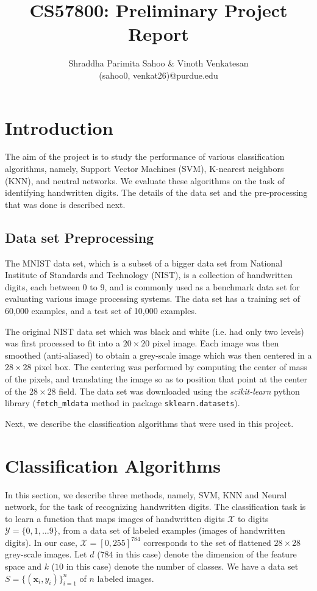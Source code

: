 \documentclass[10pt]{scrartcl}
\title{CS57800: Preliminary Project Report}
\author{Shraddha Parimita Sahoo \& Vinoth Venkatesan \\ (sahoo0, venkat26)@purdue.edu} %
\date{}
\newcommand{\vx}{\mathbf{x}}                        %
\begin{document}
\maketitle
\section*{Introduction} 
The aim of the project is to study the performance of various classification algorithms, namely, Support Vector Machines (SVM), K-nearest neighbors (KNN), and neutral networks. We evaluate these algorithms on the task of identifying handwritten digits.  The details of the data set and the pre-processing that was done
is described next.

\subsection*{Data set Preprocessing}
The MNIST data set, which is a subset of a bigger data set from National Institute of Standards and Technology (NIST),
is a collection of handwritten digits, each between 0 to 9, and is commonly used as a benchmark data set for evaluating various image processing systems.
The data set has a training set of 60,000 examples, and a test set of 10,000 examples.

The original NIST data set which was black and white (i.e. had only two levels) was first processed to fit into a $20 \times 20$ pixel image. 
Each image was then smoothed (anti-aliased) to obtain a grey-scale image which was then centered in a $28 \times 28$ pixel box.
The centering was performed by computing the center of mass of the pixels, and translating the image so as to position that point at the center of the $28 \times 28$ field. 
The data set was downloaded using the \emph{scikit-learn} python library (\texttt{fetch\_mldata} method in package \texttt{sklearn.datasets}).

Next, we describe the classification algorithms that were used in this project.

\section*{Classification Algorithms}
In this section, we describe three methods, namely, SVM, KNN and Neural network, for the task of recognizing handwritten digits. The classification
task is to learn a function that maps images of handwritten digits $\mathcal{X}$ to digits $\mathcal{Y} = \{0, 1, \ldots 9\}$,
from a data set of labeled examples (images of handwritten digits).
In our case, $\mathcal{X} = [0, 255]^{784}$ corresponds to the set of flattened $28 \times 28$ grey-scale images. 
Let $d$ ($784$ in this case) denote the dimension of the feature space and $k$ ($10$ in this case) denote the number of classes.
We have a data set $S = \{ (\vx_i, y_i)  \}_{i=1}^n$ of $n$ labeled images. 
\end{document}
